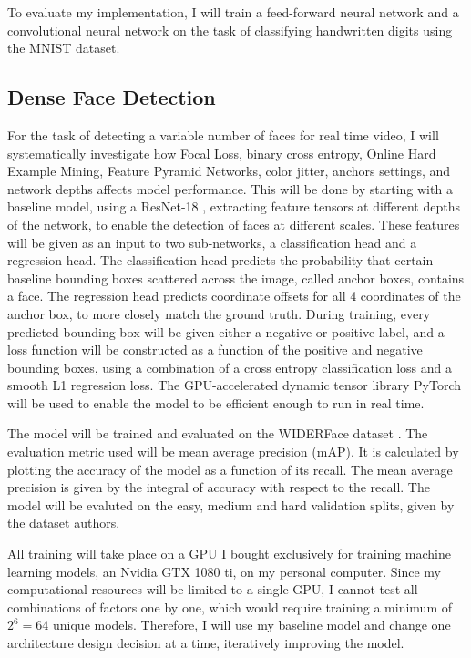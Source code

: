\documentclass[a4paper, twoside]{article}
\begin{document}
To evaluate my implementation, I will train a feed-forward neural network and a convolutional neural network on the task of classifying handwritten digits using the MNIST \cite{MNIST} dataset.

\subsection{Dense Face Detection}
For the task of detecting a variable number of faces for real time video, I will systematically investigate how Focal Loss, binary cross entropy, Online Hard Example Mining, Feature Pyramid Networks, color jitter, anchors settings, and network depths affects model performance. This will be done by starting with a baseline model, using a ResNet-18 \cite{resnet}, extracting feature tensors at different depths of the network, to enable the detection of faces at different scales. These features will be given as an input to two sub-networks, a classification head and a regression head. The classification head predicts the probability that certain baseline bounding boxes scattered across the image, called anchor boxes, contains a face. The regression head predicts coordinate offsets for all 4 coordinates of the anchor box, to more closely match the ground truth. During training, every predicted bounding box will be given either a negative or positive label, and a loss function will be constructed as a function of the positive and negative bounding boxes, using a combination of a cross entropy classification loss and a smooth L1 regression loss. The GPU-accelerated dynamic tensor library PyTorch \cite{pytorch} will be used to enable the model to be efficient enough to run in real time.

The model will be trained and evaluated on the WIDERFace dataset \cite{WIDERFace}. The evaluation metric used will be mean average precision (mAP). It is calculated by plotting the accuracy of the model as a function of its recall. The mean average precision is given by the integral of accuracy with respect to the recall. The model will be evaluted on the easy, medium and hard validation splits, given by the dataset authors.

All training will take place on a GPU I bought exclusively for training machine learning models, an Nvidia GTX 1080 ti, on my personal computer. Since my computational resources will be limited to a single GPU, I cannot test all combinations of factors one by one, which would require training a minimum of $2^6=64$ unique models. Therefore, I will use my baseline model and change one architecture design decision at a time, iteratively improving the model.
\end{document}
